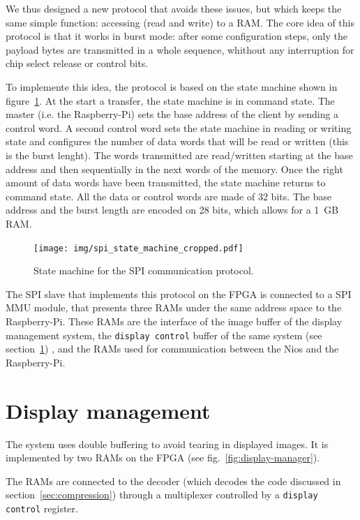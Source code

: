 \documentclass[english, DIV=13]{scrreprt}
\begin{document}
We thus designed a new protocol that avoids these issues, but which keeps the same simple
function: accessing (read and write) to a RAM.
The core idea of this protocol is that it works in burst mode: after some configuration
steps,
only the payload bytes are transmitted in a whole sequence, whithout any interruption for
chip select release or control bits.

To implemente this idea, the protocol is based on the state machine shown in
figure~\ref{fig:spi}.
At the start a transfer, the state machine is in command state.
The master (i.e. the Raspberry-Pi) sets the base address of the client by
sending a control word. A second control word sets the state machine in reading or
writing state and configures the number of data words that will be read or written
(this is the burst lenght).
The words transmitted are read/written starting at the base address and then sequentially
in the next words of the memory.
Once the right amount of data words have been transmitted, the state machine returns to
command state.
All the data or control words are made of 32 bits. The base address and the burst length
are encoded on 28 bits, which allows for a \SI{1}{GB} RAM.

\begin{figure}[bth]
    \centering
    \texttt{[image: img/spi\_state\_machine\_cropped.pdf]}
    \caption{State machine for the SPI communication protocol.}
    \label{fig:spi}
\end{figure}

The SPI slave that implements this protocol on the FPGA is connected to a SPI MMU module,
that presents three RAMs under the same address space to the Raspberry-Pi.
These RAMs are the interface of the image buffer of the display management system,
the \texttt{display control} buffer of the same system (see section~\ref{sec:display-mngt})
, and the RAMs used for communication between the Nios and the Raspberry-Pi.

\section{Display management}
\label{sec:display-mngt}

The system uses double buffering to avoid tearing in displayed images.
It is implemented by two RAMs on the FPGA (see fig.~\ref{fig:display-manager}).

The RAMs are connected to the decoder
(which decodes the code discussed in section~\ref{sec:compression})
through a multiplexer controlled by a \texttt{display control} register.
\end{document}
